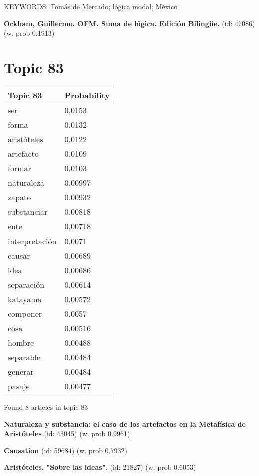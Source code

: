 \documentclass{article}
\begin{document}
KEYWORDS:
Tomás de Mercado; lógica modal; México
\vfill

\textbf{Ockham, Guillermo. OFM. Suma de lógica. Edición Bilingüe.} (id: 47086)
 (w. prob 0.1913)

\vfill
\newpage


\centering
\thispagestyle{empty}
\section*{Topic 83}\vfill
\begin{tabular}{ll}
\toprule
       Topic 83 & Probability \\
\midrule
            ser &      0.0153 \\
          forma &      0.0132 \\
    aristóteles &      0.0122 \\
      artefacto &      0.0109 \\
         formar &      0.0103 \\
     naturaleza &     0.00997 \\
         zapato &     0.00932 \\
    substanciar &     0.00818 \\
           ente &     0.00718 \\
 interpretación &      0.0071 \\
         causar &     0.00689 \\
           idea &     0.00686 \\
     separación &     0.00614 \\
       katayama &     0.00572 \\
       componer &      0.0057 \\
           cosa &     0.00516 \\
         hombre &     0.00488 \\
      separable &     0.00484 \\
        generar &     0.00484 \\
         pasaje &     0.00477 \\
\bottomrule
\end{tabular}

\vfill
Found 8 articles in topic 83
\vfill

\textbf{Naturaleza y substancia: el caso de los artefactos en la Metafísica de Aristóteles} (id: 43045)
 (w. prob 0.9961)
\vfill

\textbf{Causation} (id: 59684)
 (w. prob 0.7932)
\vfill

\textbf{Aristóteles. "Sobre las ideas".} (id: 21827)
 (w. prob 0.6053)
\end{document}
